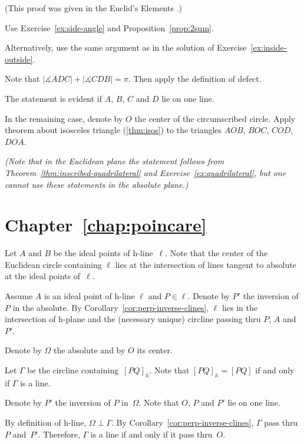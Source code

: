 (This proof was given in the Euclid's Elements \cite[Book I, Proposition 26]{euclid}.)

Use Exercise~\ref{ex:side-angle} and Proposition~\ref{prop:2sum}.

Alternatively, use the same argument as in the solution of Exercise~\ref{ex:inside-outside}.


Note that 
$|\measuredangle ADC|+|\measuredangle CDB|=\pi$.
Then apply the definition of defect.

The statement is evident if $A$, $B$, $C$ and $D$ lie on one line.

In the remaining case, 
denote by $O$ the center of the circumscribed circle.
Apply theorem about isosceles triangle (\ref{thm:isos}) to the triangles 
$AOB$,
$BOC$, 
$COD$, 
$DOA$. 

\textit{(Note that in the Euclidean plane the statement follows from Theorem~\ref{thm:inscribed-quadrilateral} and Exercise~\ref{ex:quadrilateral},
but one cannot use these statements in the absolute plane.)}

\section*{Chapter~\ref{chap:poincare}}
\setcounter{eqtn}{0}

Let $A$ and $B$ be the ideal points of h-line~$\ell$. 
Note that the center of the Euclidean circle containing $\ell$ lies 
at the intersection of lines tangent to absolute at the ideal points of~$\ell$.

Assume $A$ is an ideal point of h-line $\ell$
and $P\in \ell$.
Denote by $P'$ the inversion of $P$ in the absolute.
By Corollary~\ref{cor:perp-inverse-clines},
$\ell$ lies in the intersection of h-plane and the (necessary unique) circline 
passing thru $P$, $A$ and~$P'$.

Denote by $\Omega$ the absolute and by $O$ its center. 

Let $\Gamma$ be the circline containing~$[PQ]_h$.
Note that $[PQ]_h=[PQ]$ if and only if $\Gamma$ is a line.

Denote by $P'$ the inversion of $P$ in~$\Omega$.
Note that $O$, $P$ and $P'$ lie on one line.

By definition of h-line, $\Omega\perp \Gamma$.
By Corollary~\ref{cor:perp-inverse-clines}, $\Gamma$ pass thru $P$ and~$P'$. 
Therefore, $\Gamma$
is a line if and only if it pass thru~$O$.


